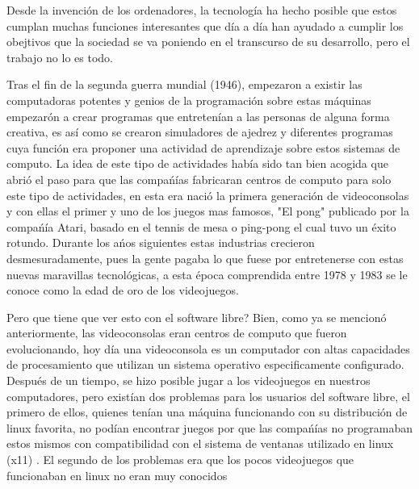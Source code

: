 \begin{multicols}{2}



\vspace{2mm}


Desde la invención de los ordenadores, la tecnología ha hecho posible que estos cumplan
muchas funciones interesantes que día a día han ayudado a cumplir los obejtivos que la sociedad
se va poniendo en el transcurso de su desarrollo, pero el trabajo no lo es todo.\\


Tras el fin de la segunda guerra mundial (1946), empezaron a existir las computadoras potentes
y genios de la programación sobre estas máquinas empezarón a crear programas que entretenían a 
las personas de alguna forma creativa, es así  como se crearon simuladores de ajedrez y diferentes
programas cuya función era proponer una actividad de aprendizaje sobre estos sistemas de computo.
La idea de este tipo de actividades había sido tan bien acogida que abrió el paso para que las compańías
fabricaran centros de computo para solo este tipo de actividades, en esta era nació la primera generación de
videoconsolas y con ellas el primer y uno de los juegos mas famosos, "El pong" publicado por la compańía Atari,
basado en el tennis de mesa o ping-pong el cual tuvo un éxito rotundo. Durante los ańos siguientes estas 
industrias crecieron 
desmesuradamente, pues la gente pagaba lo que fuese por entretenerse con estas nuevas maravillas tecnológicas,
a esta época comprendida entre 1978 y 1983 se le conoce como la edad de oro de los videojuegos.



Pero que tiene que ver esto con el software libre?
Bien, como ya se mencionó anteriormente, las videoconsolas eran centros de computo que fueron evolucionando, 
hoy día una videoconsola es un computador con altas capacidades de procesamiento que utilizan un sistema operativo especificamente configurado.
Después de un tiempo, se hizo posible jugar a los videojuegos en nuestros computadores, pero existían dos problemas
para los usuarios del software libre, el primero de ellos, quienes tenían una máquina funcionando con su distribución 
de linux favorita, no podían encontrar juegos por que las compańías no programaban estos mismos con compatibilidad 
con el sistema de ventanas utilizado en linux (x11) .
El segundo de los problemas era que los pocos videojuegos que funcionaban en linux no eran muy conocidos



\end{multicols}
